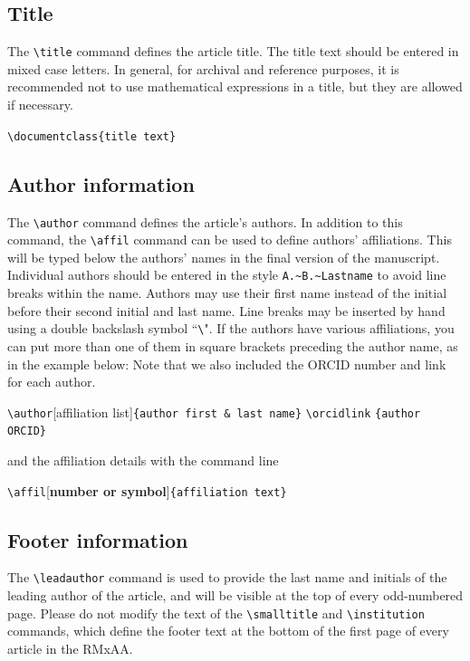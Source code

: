 \documentclass[9pt,twoside]{rmaa-rho-class/rmaa-rho_light}
\newcommand{\CS}[1]{\texttt{\textbackslash #1}}
\begin{document}
    \subsection{Title}

        The \CS{title} command defines the article title. The title text should be entered in mixed case letters. In general, for archival and reference purposes, it is recommended not to use mathematical expressions in a title, but they are allowed if necessary. 

        \bigskip
        \verb|\documentclass{title text}|
        \bigskip

    \subsection{Author information}
    
        The \CS{author} command defines the article’s authors. In addition to this command, the \CS{affil} command can be used to define authors’ affiliations. This will be typed below the authors’ names in the final version of the manuscript. Individual authors should be entered in the style \texttt{A.\~{}B.\~{}Lastname} to avoid line breaks within the name. Authors may use their first name instead of the initial before their second initial and last name.  Line breaks may be inserted by hand using a double backslash symbol “\CS \CS". If the authors have various affiliations, you can put more than one of them in square brackets preceding the author name, as in the example below: Note that we also included the ORCID number and link for each author.
    
        \bigskip
        
        \CS{author}[{affiliation list}]\verb|{author first & last name}|  \CS{orcidlink} \verb|{author ORCID}|
        
        \bigskip
        and the affiliation details with the command line
        
        \bigskip
        \CS{affil}[\textbf{number or symbol}]\verb|{affiliation text}|

        \bigskip
    
    \subsection{Footer information}
    
        The \CS{leadauthor} command is used to provide the last name and initials of the leading author of the article, and will be visible at the top of every odd-numbered page. Please do not modify the text of the \CS{smalltitle} and \CS{institution} commands, which define the footer text at the bottom of the first page of every article in the RMxAA.
    
\end{document}
